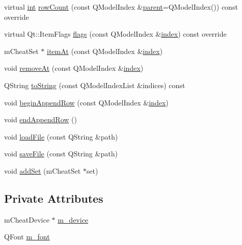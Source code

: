 \begin{DoxyCompactItemize}
\item 
virtual \mbox{\hyperlink{ioapi_8h_a787fa3cf048117ba7123753c1e74fcd6}{int}} \mbox{\hyperlink{class_q_g_b_a_1_1_cheats_model_af5b83785c1441b04571a78b402ef43fa}{row\+Count}} (const Q\+Model\+Index \&\mbox{\hyperlink{class_q_g_b_a_1_1_cheats_model_a4afdb0b4cf8e3ee616a79ad63bb2e98b}{parent}}=Q\+Model\+Index()) const override
\item 
virtual Qt\+::\+Item\+Flags \mbox{\hyperlink{class_q_g_b_a_1_1_cheats_model_aa0e0b6c1e35f76327dc901764b490f9a}{flags}} (const Q\+Model\+Index \&\mbox{\hyperlink{class_q_g_b_a_1_1_cheats_model_a55247862e978913005dfae95e0f3753c}{index}}) const override
\item 
m\+Cheat\+Set $\ast$ \mbox{\hyperlink{class_q_g_b_a_1_1_cheats_model_affb9da60adcba28c5baae235f100b414}{item\+At}} (const Q\+Model\+Index \&\mbox{\hyperlink{class_q_g_b_a_1_1_cheats_model_a55247862e978913005dfae95e0f3753c}{index}})
\item 
void \mbox{\hyperlink{class_q_g_b_a_1_1_cheats_model_a0247027ad4319ebfa3334a213a1bdb4e}{remove\+At}} (const Q\+Model\+Index \&\mbox{\hyperlink{class_q_g_b_a_1_1_cheats_model_a55247862e978913005dfae95e0f3753c}{index}})
\item 
Q\+String \mbox{\hyperlink{class_q_g_b_a_1_1_cheats_model_aa5ed02b531e391355f9dec37a2f56f96}{to\+String}} (const Q\+Model\+Index\+List \&indices) const
\item 
void \mbox{\hyperlink{class_q_g_b_a_1_1_cheats_model_a6f4d9ca30bb173d60011b29de8ad290f}{begin\+Append\+Row}} (const Q\+Model\+Index \&\mbox{\hyperlink{class_q_g_b_a_1_1_cheats_model_a55247862e978913005dfae95e0f3753c}{index}})
\item 
void \mbox{\hyperlink{class_q_g_b_a_1_1_cheats_model_adf72c74102cb610a47a03fe1251fa5e9}{end\+Append\+Row}} ()
\item 
void \mbox{\hyperlink{class_q_g_b_a_1_1_cheats_model_a0177e1111cf3f303ce64dbb216a5eed3}{load\+File}} (const Q\+String \&path)
\item 
void \mbox{\hyperlink{class_q_g_b_a_1_1_cheats_model_a13d9efacd0bee0a791167365c2a9b7ba}{save\+File}} (const Q\+String \&path)
\item 
void \mbox{\hyperlink{class_q_g_b_a_1_1_cheats_model_aab186665fb45851e46b12ef51df879e2}{add\+Set}} (m\+Cheat\+Set $\ast$set)
\end{DoxyCompactItemize}
\subsection*{Private Attributes}
\begin{DoxyCompactItemize}
\item 
m\+Cheat\+Device $\ast$ \mbox{\hyperlink{class_q_g_b_a_1_1_cheats_model_ac06665c1e57cc1b07916887eef1e0352}{m\+\_\+device}}
\item 
Q\+Font \mbox{\hyperlink{class_q_g_b_a_1_1_cheats_model_adf770872dfc5a1ff2c47e3b855764008}{m\+\_\+font}}
\end{DoxyCompactItemize}


